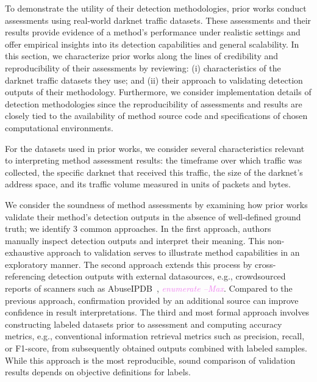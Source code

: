 \documentclass[manuscript,nonacm]{acmart}
\newcommand{\maxnote}[1]{\textit{\textcolor{violet}{#1 --Max}}}
\begin{document}
To demonstrate the utility of their detection methodologies, prior works conduct assessments using real-world darknet traffic datasets.
These assessments and their results provide evidence of a method's performance under realistic settings and offer empirical insights into its detection capabilities and general scalability.
In this section, we characterize prior works along the lines of credibility and reproducibility of their assessments by reviewing:
(i) characteristics of the darknet traffic datasets they use; and
(ii) their approach to validating detection outputs of their methodology.
Furthermore, we consider implementation details of detection methodologies since the reproducibility of assessments and results are closely tied to the availability of method source code and specifications of chosen computational environments.

\vspace{0.25em}
For the datasets used in prior works, we consider several characteristics relevant to interpreting method assessment results:
the timeframe over which traffic was collected, the specific darknet that received this traffic, the size of the darknet's address space, and its traffic volume measured in units of packets and bytes.

\vspace{0.25em}
We consider the soundness of method assessments by examining how prior works validate their method's detection outputs in the absence of well-defined ground truth; we identify 3 common approaches.
In the first approach, authors~\cite{@@} manually inspect detection outputs and interpret their meaning. This non-exhaustive approach to validation serves to illustrate method capabilities in an exploratory manner.
The second approach extends this process by cross-referencing detection outputs with external datasources, e.g., crowdsourced reports of scanners such as AbuseIPDB~\cite{@@}, \maxnote{enumerate}. Compared to the previous approach, confirmation provided by an additional source can improve confidence in result interpretations.
The third and most formal approach involves constructing labeled datasets prior to assessment and computing accuracy metrics, e.g., conventional information retrieval metrics such as precision, recall, or F1-score, from subsequently obtained outputs combined with labeled samples. While this approach is the most reproducible, sound comparison of validation results depends on objective definitions for labels.
\end{document}
